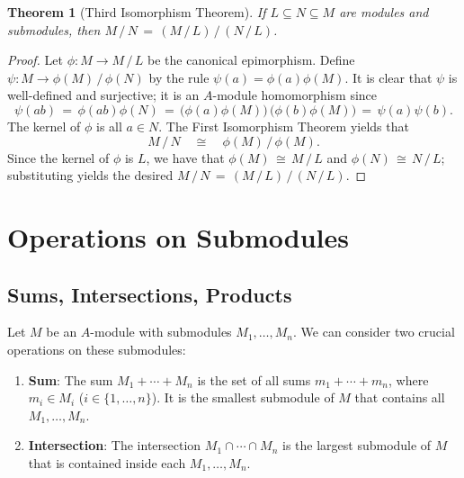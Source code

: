 \documentclass[11pt]{article}
\newtheorem{theorem}{Theorem}
\begin{document}
\begin{adjustwidth}{0.5cm}{}
  \begin{theorem}[Third Isomorphism Theorem]
    If $L \subseteq N \subseteq  M$ are modules and submodules, then $M \, / \, N \, = \, (M \, / \, L) \, / \, (N \, / \, L)$.
  \end{theorem}
  \begin{proof}
    Let $\phi : M \to M \, / \, L$ be the canonical epimorphism. Define $\psi : M \to \phi(M) \, / \, \phi(N)$ by the rule $\psi(a) = \phi(a)\phi(M)$. It is clear that $\psi$ is well-defined and surjective; it is an $A$-module homomorphism since
    \[
      \psi(ab) \, = \, \phi(ab) \phi(N) \, = \, \big(\phi(a) \phi(M)\big) \, \big(\phi(b) \phi(M) \big) \, = \, \psi(a) \psi(b).
    \]
    The kernel of $\phi$ is all $a \in N$. The First Isomorphism Theorem yields that
    \[
      M \, / \, N \quad \cong \quad \phi(M) \, / \, \phi(M).
    \]
    Since the kernel of $\phi$ is $L$, we have that $\phi(M) \, \cong \, M \, / \, L$ and $\phi(N) \, \cong \, N \, / \, L$; substituting yields the desired $M \, / \, N \, = \, (M \, / \, L) \, / \, (N \, / \, L)$.
  \end{proof}
\end{adjustwidth}


\section{Operations on Submodules}


\subsection{Sums, Intersections, Products}

Let $M$ be an $A$-module with submodules $M_{1}, \ldots, M_{n}$. We can consider two crucial operations on these submodules:
\begin{enumerate}
	\item \textbf{Sum}: The sum $M_{1} + \cdots + M_{n}$ is the set of all sums $m_{1} + \cdots + m_{n}$, where $m_{i} \in M_{i}$ ($i \in \{ 1, \ldots, n \}$). It is the smallest submodule of $M$ that contains all $M_{1}, \ldots, M_{n}$.
	\item \textbf{Intersection}: The intersection $M_{1} \cap \cdots \cap M_{n}$ is the largest submodule of $M$ that is contained inside each $M_{1}, \ldots, M_{n}$.
\end{enumerate}
\end{document}
